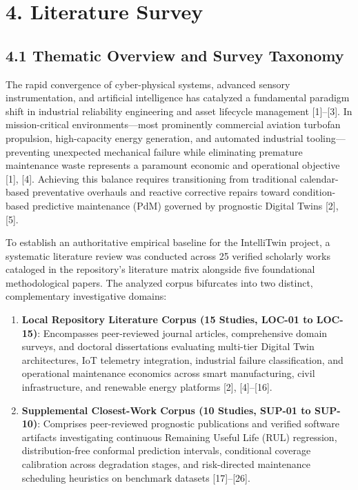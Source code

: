 \documentclass[12pt,a4paper]{article}
\begin{document}
\section*{4. Literature Survey}

\subsection*{4.1 Thematic Overview and Survey Taxonomy}
The rapid convergence of cyber-physical systems, advanced sensory instrumentation, and artificial intelligence has catalyzed a fundamental paradigm shift in industrial reliability engineering and asset lifecycle management [1]--[3]. In mission-critical environments—most prominently commercial aviation turbofan propulsion, high-capacity energy generation, and automated industrial tooling—preventing unexpected mechanical failure while eliminating premature maintenance waste represents a paramount economic and operational objective [1], [4]. Achieving this balance requires transitioning from traditional calendar-based preventative overhauls and reactive corrective repairs toward condition-based predictive maintenance (PdM) governed by prognostic Digital Twins [2], [5].

To establish an authoritative empirical baseline for the IntelliTwin project, a systematic literature review was conducted across 25 verified scholarly works cataloged in the repository's literature matrix alongside five foundational methodological papers. The analyzed corpus bifurcates into two distinct, complementary investigative domains:
\begin{enumerate}
    \item \textbf{Local Repository Literature Corpus (15 Studies, LOC-01 to LOC-15)}: Encompasses peer-reviewed journal articles, comprehensive domain surveys, and doctoral dissertations evaluating multi-tier Digital Twin architectures, IoT telemetry integration, industrial failure classification, and operational maintenance economics across smart manufacturing, civil infrastructure, and renewable energy platforms [2], [4]--[16].
    \item \textbf{Supplemental Closest-Work Corpus (10 Studies, SUP-01 to SUP-10)}: Comprises peer-reviewed prognostic publications and verified software artifacts investigating continuous Remaining Useful Life (RUL) regression, distribution-free conformal prediction intervals, conditional coverage calibration across degradation stages, and risk-directed maintenance scheduling heuristics on benchmark datasets [17]--[26].
\end{enumerate}
\end{document}
